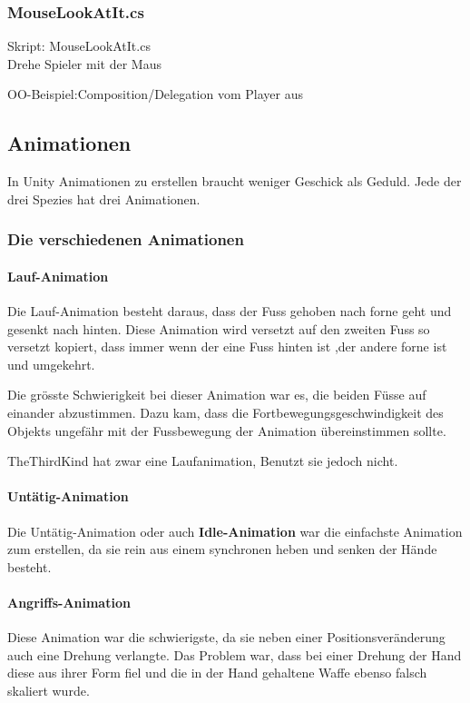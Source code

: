\subsubsection{MouseLookAtIt.cs}
Skript: MouseLookAtIt.cs\\
Drehe Spieler mit der Maus

OO-Beispiel:Composition/Delegation vom Player aus

\subsection{Animationen}
In Unity Animationen zu erstellen braucht weniger Geschick als Geduld.
Jede der drei Spezies hat drei Animationen.


\subsubsection{Die verschiedenen Animationen}
\paragraph{Lauf-Animation}

Die Lauf-Animation besteht daraus, dass der Fuss gehoben nach forne geht und gesenkt nach hinten. Diese Animation wird versetzt auf den zweiten Fuss so versetzt kopiert, dass immer wenn der eine Fuss hinten ist ,der andere forne ist und umgekehrt.

Die grösste Schwierigkeit bei dieser Animation war es, die beiden Füsse auf einander abzustimmen.
Dazu kam, dass die Fortbewegungsgeschwindigkeit des Objekts ungefähr mit der Fussbewegung der Animation übereinstimmen sollte.

TheThirdKind hat zwar eine Laufanimation, Benutzt sie jedoch nicht.
\paragraph{Untätig-Animation}
Die Untätig-Animation oder auch \textbf{Idle-Animation} war die einfachste Animation zum erstellen, da sie rein aus einem synchronen heben und senken der Hände besteht.

\paragraph{Angriffs-Animation}

Diese Animation war die schwierigste, da sie neben einer Positionsveränderung auch eine Drehung verlangte.
Das Problem war, dass bei einer Drehung der Hand diese aus ihrer Form fiel und die in der Hand gehaltene Waffe ebenso falsch skaliert wurde.

